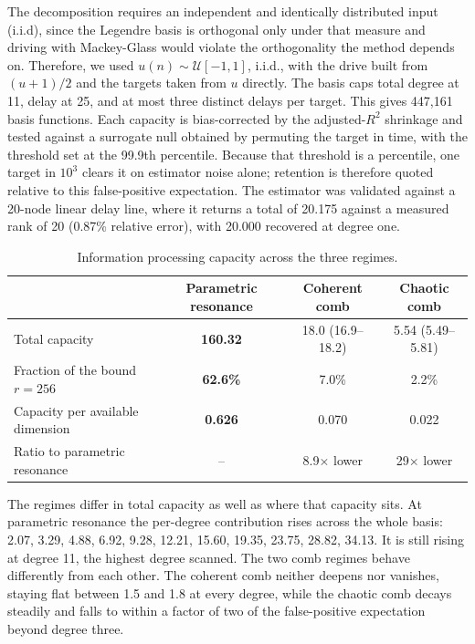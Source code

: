 \documentclass{ar2rc}
\begin{document}
The decomposition requires an independent and identically distributed input (i.i.d), since the Legendre basis is orthogonal only under that measure and driving with Mackey-Glass would violate the orthogonality the method depends on. Therefore, we used $u\left(n\right)\sim\mathcal{U}\left[-1,1\right]$, i.i.d., with the drive built from $(u+1)/2$ and the targets taken from $u$ directly. The basis caps total degree at 11, delay at 25, and at most three distinct delays per target. This gives 447,161 basis functions. Each capacity is bias-corrected by the adjusted-$R^2$ shrinkage and tested against a surrogate null obtained by permuting the target in time, with the threshold set at the 99.9th percentile. Because that threshold is a percentile, one target in $10^{3}$ clears it on estimator noise alone; retention is therefore quoted relative to this false-positive expectation. The estimator was validated against a 20-node linear delay line, where it returns a total of 20.175 against a measured rank of 20 (0.87\% relative error), with 20.000 recovered at degree one.

\begin{table}[htbp]
	\centering
	\begin{tabular}{lccc}
		\hline
		& Parametric resonance & Coherent comb & Chaotic comb \\
		\hline
		Total capacity
		& \textbf{160.32}
		& 18.0 (16.9--18.2)
		& 5.54 (5.49--5.81) \\

		Fraction of the bound $r = 256$
		& \textbf{62.6\%}
		& 7.0\%
		& 2.2\% \\

		Capacity per available dimension
		& \textbf{0.626}
		& 0.070
		& 0.022 \\

		Ratio to parametric resonance
		& --
		& 8.9$\times$ lower
		& 29$\times$ lower \\
		\hline
	\end{tabular}
	\caption{Information processing capacity across the three regimes.}
	\label{tab:capacity_comparison}
\end{table}
The regimes differ in total capacity as well as where that capacity sits. At parametric resonance the per-degree contribution rises across the whole basis: 2.07, 3.29, 4.88, 6.92, 9.28, 12.21, 15.60, 19.35, 23.75, 28.82, 34.13. It is still rising at degree 11, the highest degree scanned. The two comb regimes behave differently from each other. The coherent comb neither deepens nor vanishes, staying flat between 1.5 and 1.8 at every degree, while the chaotic comb decays steadily and falls to within a factor of two of the false-positive expectation beyond degree three.
\end{document}
